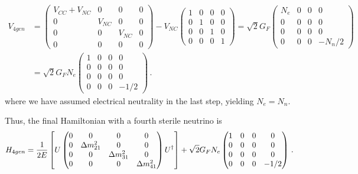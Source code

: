 \begin{align}\label{eq:Vsterile}
    V_{4gen} &=
    \begin{pmatrix}
        V_{CC} + V_{NC} & 0 & 0 & 0 \\
        0 &V_{NC} & 0 & 0 \\
        0 & 0 & V_{NC} & 0 \\
        0 & 0 & 0 & 0 
    \end{pmatrix} - V_{NC}\begin{pmatrix}
        1 & 0 & 0 & 0 \\
        0 &1 & 0 & 0 \\
        0 & 0 & 1 & 0 \\
        0 & 0 & 0 & 1 
    \end{pmatrix}
    = \sqrt{2}G_F\begin{pmatrix}
        N_e & 0 & 0 & 0 \\
        0 &0 & 0 & 0 \\
        0 & 0 & 0 & 0 \\
        0 & 0 & 0 & -N_n/2
    \end{pmatrix} \nonumber \\
    &=\sqrt{2}G_F N_e\begin{pmatrix}
        1 & 0 & 0 & 0 \\
        0 &0 & 0 & 0 \\
        0 & 0 & 0 & 0 \\
        0 & 0 & 0 & -1/2
    \end{pmatrix}\,.
\end{align}
where we have assumed electrical neutrality in the last step, yielding $N_e = N_n$.

Thus, the final Hamiltonian with a fourth sterile neutrino is 
\begin{align}\label{eq:H_4gen}
    H_{4gen} &= \frac{1}{2E}\left[U \begin{pmatrix}
            0 & 0 & 0 & 0\\
            0 & \dm_{21} & 0  & 0 \\
            0 & 0 & \dm_{31} & 0 \\
            0 & 0 & 0 & \dm_{41} \\
        \end{pmatrix} U^\dagger\right] + \sqrt{2}G_F N_e 
        \begin{pmatrix}
            1 & 0 & 0 & 0 \\
            0 & 0 & 0 & 0 \\
            0 & 0 & 0 & 0 \\
            0 & 0 & 0 & -1/2
        \end{pmatrix}\,. 
\end{align}

